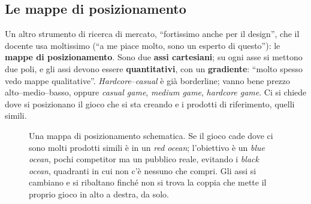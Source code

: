\subsection{Le mappe di posizionamento}



Un altro strumento di ricerca di mercato, ``fortissimo anche per il design'', che il
docente usa moltissimo (``a me piace molto, sono un esperto di questo''): le
\textbf{mappe di posizionamento}. Sono due \textbf{assi cartesiani}; su ogni asse si
mettono due poli, e gli assi devono essere \textbf{quantitativi}, con un
\textbf{gradiente}: ``molto spesso vedo mappe qualitative''. \emph{Hardcore}--\emph{casual}
è già borderline; vanno bene prezzo alto--medio--basso, oppure \emph{casual game},
\emph{medium game}, \emph{hardcore game}. Ci si chiede dove si posizionano il gioco che si
sta creando e i prodotti di riferimento, quelli simili.

\begin{figure}[htbp]
\centering
{}
\caption{Una mappa di posizionamento schematica. Se il gioco cade dove ci sono molti
prodotti simili è in un \emph{red ocean}; l'obiettivo è un \emph{blue ocean}, pochi
competitor ma un pubblico reale, evitando i \emph{black ocean}, quadranti in cui non c'è
nessuno che compri. Gli assi si cambiano e si ribaltano finché non si trova la coppia che
mette il proprio gioco in alto a destra, da solo.}
\label{a5:fig:posizionamento}
\end{figure}

